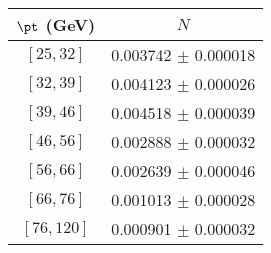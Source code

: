 \begin{tabular}{c||c}
$\pt$ (GeV) & $N$  \\
\hline
$[25, 32]$ & 0.003742 $\pm$ 0.000018\\
$[32, 39]$ & 0.004123 $\pm$ 0.000026\\
$[39, 46]$ & 0.004518 $\pm$ 0.000039\\
$[46, 56]$ & 0.002888 $\pm$ 0.000032\\
$[56, 66]$ & 0.002639 $\pm$ 0.000046\\
$[66, 76]$ & 0.001013 $\pm$ 0.000028\\
$[76, 120]$ & 0.000901 $\pm$ 0.000032\\
\end{tabular}
